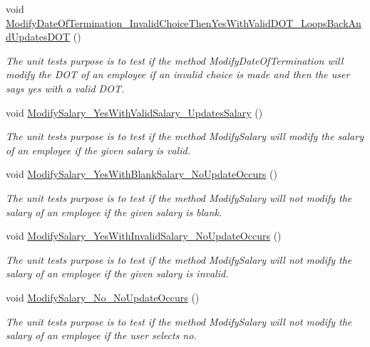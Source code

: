 \begin{DoxyCompactItemize}
void \hyperlink{class_the_company_1_1_tests_1_1_modify_employee_tests_a9e9a818914bf3b12604c96028db706e5}{Modify\+Date\+Of\+Termination\+\_\+\+Invalid\+Choice\+Then\+Yes\+With\+Valid\+D\+O\+T\+\_\+\+Loops\+Back\+And\+Updates\+D\+O\+T} ()
\begin{DoxyCompactList}\small\item\em The unit test\textquotesingle{}s purpose is to test if the method Modify\+Date\+Of\+Termination will modify the D\+O\+T of an employee if an invalid choice is made and then the user says yes with a valid D\+O\+T. \end{DoxyCompactList}\item 
void \hyperlink{class_the_company_1_1_tests_1_1_modify_employee_tests_a6c22717cd94c30a0e0d7e1bfaf992c51}{Modify\+Salary\+\_\+\+Yes\+With\+Valid\+Salary\+\_\+\+Updates\+Salary} ()
\begin{DoxyCompactList}\small\item\em The unit test\textquotesingle{}s purpose is to test if the method Modify\+Salary will modify the salary of an employee if the given salary is valid. \end{DoxyCompactList}\item 
void \hyperlink{class_the_company_1_1_tests_1_1_modify_employee_tests_acb84bc84a22660502e348a1e25f71366}{Modify\+Salary\+\_\+\+Yes\+With\+Blank\+Salary\+\_\+\+No\+Update\+Occurs} ()
\begin{DoxyCompactList}\small\item\em The unit test\textquotesingle{}s purpose is to test if the method Modify\+Salary will not modify the salary of an employee if the given salary is blank. \end{DoxyCompactList}\item 
void \hyperlink{class_the_company_1_1_tests_1_1_modify_employee_tests_a470db7c40bfce3d39cfe9af499e047a6}{Modify\+Salary\+\_\+\+Yes\+With\+Invalid\+Salary\+\_\+\+No\+Update\+Occurs} ()
\begin{DoxyCompactList}\small\item\em The unit test\textquotesingle{}s purpose is to test if the method Modify\+Salary will not modify the salary of an employee if the given salary is invalid. \end{DoxyCompactList}\item 
void \hyperlink{class_the_company_1_1_tests_1_1_modify_employee_tests_af09be793224e82895b17a3479dabbede}{Modify\+Salary\+\_\+\+No\+\_\+\+No\+Update\+Occurs} ()
\begin{DoxyCompactList}\small\item\em The unit test\textquotesingle{}s purpose is to test if the method Modify\+Salary will not modify the salary of an employee if the user selects no. \end{DoxyCompactList}\item 

\end{DoxyCompactItemize}

